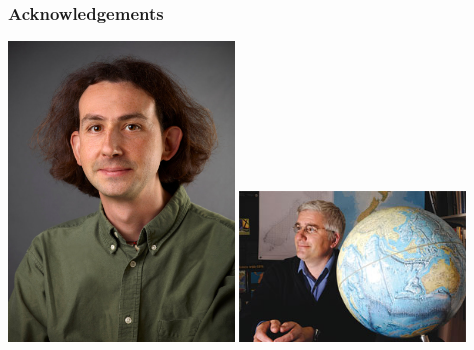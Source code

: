 \documentclass{beamer}
\begin{document}
\begin{frame}
  \frametitle{Acknowledgements}
  \begin{center}
    \includegraphics[width=0.45\textwidth,height=0.4\textheight,keepaspectratio=true]{figure/committee/ken}
    \includegraphics[width=0.45\textwidth,height=0.4\textheight,keepaspectratio=true]{figure/committee/foote}


\end{center}
\end{frame}
\end{document}
